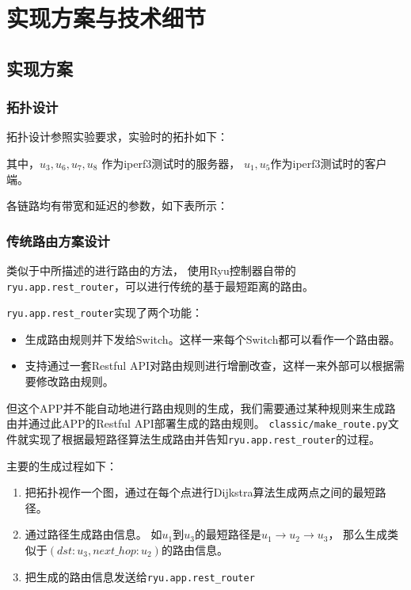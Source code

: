 \section{实现方案与技术细节}

\subsection{实现方案}

\subsubsection{拓扑设计}

拓扑设计参照实验要求，实验时的拓扑如下：



其中，$u_{3},u_{6},u_{7},u_{8}$ 作为iperf3测试时的服务器，
$u_{1},u_{5}$作为iperf3测试时的客户端。

各链路均有带宽和延迟的参数，如下表所示：



\subsubsection{传统路由方案设计}

类似于\cite{team2014ryu}中所描述的进行路由的方法，
使用Ryu控制器自带的 \texttt{ryu.app.rest\_router}，可以进行传统的基于最短距离的路由。

\texttt{ryu.app.rest\_router}实现了两个功能：

\begin{itemize}
	\item 生成路由规则并下发给Switch。这样一来每个Switch都可以看作一个路由器。
	\item 支持通过一套Restful API对路由规则进行增删改查，这样一来外部可以根据需要修改路由规则。
\end{itemize}

但这个APP并不能自动地进行路由规则的生成，我们需要通过某种规则来生成路由并通过此APP的Restful API部署生成的路由规则。
\texttt{classic/make\_route.py}文件就实现了根据最短路径算法生成路由并告知\texttt{ryu.app.rest\_router}的过程。

主要的生成过程如下：

\begin{enumerate}
	\item 把拓扑视作一个图，通过在每个点进行Dijkstra算法生成两点之间的最短路径。
	\item 通过路径生成路由信息。
如$u_1$到$u_3$的最短路径是$u_1 \rightarrow u_2 \rightarrow u_3$，
那么生成类似于$(dst:u_3, next\_hop:u_2)$的路由信息。
	\item 把生成的路由信息发送给\texttt{ryu.app.rest\_router}
\end{enumerate}

